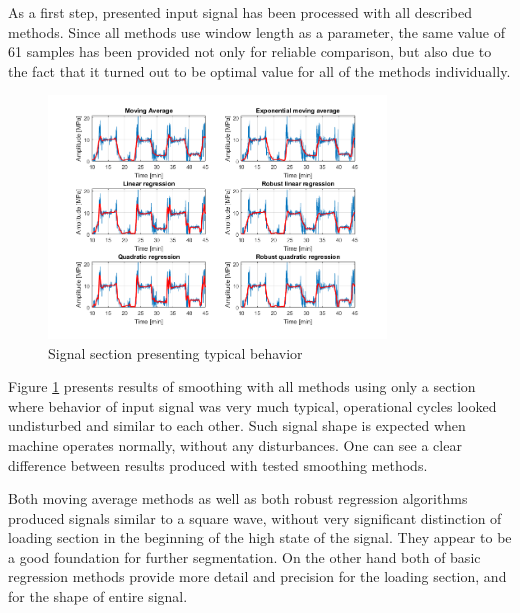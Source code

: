 \documentclass{webofc}
\begin{document}
As a first step, presented input signal has been processed with all described methods. Since all methods use window length as a parameter, the same value of 61 samples has been provided not only for reliable comparison, but also due to the fact that it turned out to be optimal value for all of the methods individually.

\begin{figure}[ht!]
\centering
\includegraphics[width=0.8\textwidth,clip]{ladne}
\vspace*{-0.8cm}
\caption{Signal section presenting typical behavior}
\label{ladne}       %
\vspace*{-0.8cm}
\end{figure}

Figure \ref{ladne} presents results of smoothing with all methods using only a section where behavior of input signal was very much typical, operational cycles looked undisturbed and similar to each other. Such signal shape is expected when machine operates normally, without any disturbances. One can see a clear difference between results produced with tested smoothing methods. 

Both moving average methods as well as both robust regression algorithms produced signals similar to a square wave, without very significant distinction of loading section in the beginning of the high state of the signal. They appear to be a good foundation for further segmentation. On the other hand both of basic regression methods provide more detail and precision for the loading section, and for the shape of entire signal.
\end{document}
